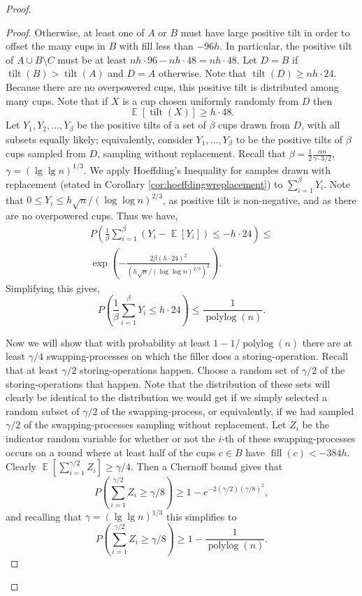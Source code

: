 \documentclass[twocolumn]{article}[10pt]
\DeclareMathOperator{\E}{\mathbb{E}}
\DeclareMathOperator{\polylog}{\text{polylog}}
\DeclareMathOperator{\tilt}{\text{tilt}}
\DeclareMathOperator{\fil}{\text{fill}}
\begin{document}
\begin{proof}
\begin{proof}
  Otherwise, at least one of $A$ or $B$ must have large positive tilt in order
  to offset the many cups in $B$ with fill less than $-96h$. In particular, the
  positive tilt of $A \cup B \setminus C$ must be at least $nh\cdot 96 - nh\cdot 48 =
  nh\cdot 48$. Let $D=B$ if $\tilt(B) > \tilt(A)$ and $D=A$ otherwise. Note that
  $\tilt(D) \ge nh\cdot 24$. Because there are no overpowered cups, this positive
  tilt is distributed among many cups. Note that if $X$ is a cup chosen
  uniformly randomly from $D$ then $$\E[\tilt(X)] \ge h\cdot 48.$$ Let
  $Y_1,Y_2,\ldots, Y_\beta$ be the positive tilts of a set of $\beta$ cups
  drawn from $D$, with all subsets equally likely; equivalently, consider
  $Y_1,\ldots, Y_\beta$ to be the positive tilts of $\beta$ cups sampled from
  $D$, sampling without replacement. Recall that $\beta =
  \frac{1}{2}\frac{\alpha n}{\gamma\cdot 3/2}$, $\gamma = (\lg \lg n)^{1/3}$.
  We apply Hoeffding's Inequality for samples drawn with replacement (stated in
  Corollary \ref{cor:hoeffdingwreplacement}) to $\sum_{i=1}^\beta Y_i$. Note
  that $0\le Y_i \le h\sqrt{n}/(\log\log n)^{2/3}$, as positive tilt is
  non-negative, and as there are no overpowered cups. 
  Thus we have, 
  \begin{align*}
  P\left(\frac{1}{\beta} \sum_{i=1}^{\beta} (Y_i - \E[Y_i]) \le -h\cdot 24 \right) \le\\
  \exp\left(-\frac{2\beta(h\cdot 24)^2}{(h\sqrt{n}/(\log\log n)^{2/3})^2}\right).
  \end{align*}
  Simplifying this gives,
  $$P\left(\frac{1}{\beta}\sum_{i=1}^{\beta} Y_i \le h\cdot 24\right) \le \frac{1}{\polylog(n)}.$$

  Now we will show that with probability at least $1-1/\polylog(n)$ there are
  at least $\gamma/4$ swapping-processes on which the filler does a
  storing-operation.
  Recall that at least $\gamma/2$ storing-operations happen. Choose a random
  set of $\gamma/2$ of the storing-operations that happen. Note that the
  distribution of these sets will clearly be identical to the distribution we
  would get if we simply selected a random subset of $\gamma/2$ of the
  swapping-process, or equivalently, if we had sampled $\gamma/2$ of the
  swapping-processes sampling without replacement. Let $Z_i$ be the indicator
  random variable for whether or not the $i$-th of these swapping-processes occurs on a round
  where at least half of the cups $c \in B$ have $\fil(c) < -384h$.
  Clearly $\E\left[\sum_{i=1}^{\gamma/2} Z_i\right] \ge \gamma/4.$ 
  Then a Chernoff bound gives that
  $$P\left(\sum_{i=1}^{\gamma/2} Z_i \ge \gamma/8 \right) \ge 1-e^{-2(\gamma/2) (\gamma/8)^2},$$
  and recalling that $\gamma=(\lg\lg n)^{1/3}$ this simplifies to 
  $$P\left(\sum_{i=1}^{\gamma/2} Z_i \ge \gamma/8 \right) \ge 1-\frac{1}{\polylog(n)}.$$


\end{proof}
\end{proof}
\end{document}

